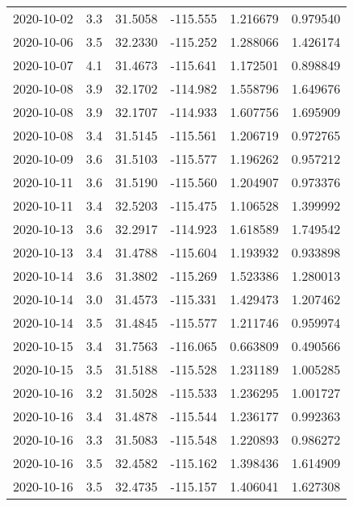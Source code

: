 \begin{tabular}{lrrrrr}
2020-10-02 &       3.3 &  31.5058 &  -115.555 &         1.216679 &         0.979540 \\
2020-10-06 &       3.5 &  32.2330 &  -115.252 &         1.288066 &         1.426174 \\
2020-10-07 &       4.1 &  31.4673 &  -115.641 &         1.172501 &         0.898849 \\
2020-10-08 &       3.9 &  32.1702 &  -114.982 &         1.558796 &         1.649676 \\
2020-10-08 &       3.9 &  32.1707 &  -114.933 &         1.607756 &         1.695909 \\
2020-10-08 &       3.4 &  31.5145 &  -115.561 &         1.206719 &         0.972765 \\
2020-10-09 &       3.6 &  31.5103 &  -115.577 &         1.196262 &         0.957212 \\
2020-10-11 &       3.6 &  31.5190 &  -115.560 &         1.204907 &         0.973376 \\
2020-10-11 &       3.4 &  32.5203 &  -115.475 &         1.106528 &         1.399992 \\
2020-10-13 &       3.6 &  32.2917 &  -114.923 &         1.618589 &         1.749542 \\
2020-10-13 &       3.4 &  31.4788 &  -115.604 &         1.193932 &         0.933898 \\
2020-10-14 &       3.6 &  31.3802 &  -115.269 &         1.523386 &         1.280013 \\
2020-10-14 &       3.0 &  31.4573 &  -115.331 &         1.429473 &         1.207462 \\
2020-10-14 &       3.5 &  31.4845 &  -115.577 &         1.211746 &         0.959974 \\
2020-10-15 &       3.4 &  31.7563 &  -116.065 &         0.663809 &         0.490566 \\
2020-10-15 &       3.5 &  31.5188 &  -115.528 &         1.231189 &         1.005285 \\
2020-10-16 &       3.2 &  31.5028 &  -115.533 &         1.236295 &         1.001727 \\
2020-10-16 &       3.4 &  31.4878 &  -115.544 &         1.236177 &         0.992363 \\
2020-10-16 &       3.3 &  31.5083 &  -115.548 &         1.220893 &         0.986272 \\
2020-10-16 &       3.5 &  32.4582 &  -115.162 &         1.398436 &         1.614909 \\
2020-10-16 &       3.5 &  32.4735 &  -115.157 &         1.406041 &         1.627308 \\

\end{tabular}
